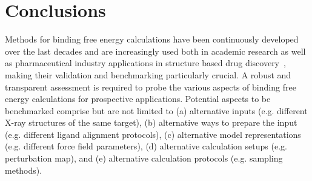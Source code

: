 \documentclass[9pt,bestpractices]{livecoms}
\begin{document}




\section{Conclusions}
\label{sec:conclusion}

Methods for binding free energy calculations have been continuously developed over the last decades and are increasingly used both in academic research as well as pharmaceutical industry applications in structure based drug discovery~\cite{sherborne_collaborating_2016, gapsysLargeScaleRelative2020,schindler_largescale_2020}, making their validation and benchmarking particularly crucial. 
%
A robust and transparent assessment is required to probe the various aspects of binding free energy calculations for prospective applications.  Potential aspects to be benchmarked comprise but are not limited to
(a) alternative inputs (e.g. different X-ray structures of the same target),
(b) alternative ways to prepare the input (e.g. different ligand alignment protocols),
(c) alternative model representations (e.g. different force field parameters),
(d) alternative calculation setups (e.g. perturbation map), and
(e) alternative calculation protocols (e.g. sampling methods).
%
\end{document}
